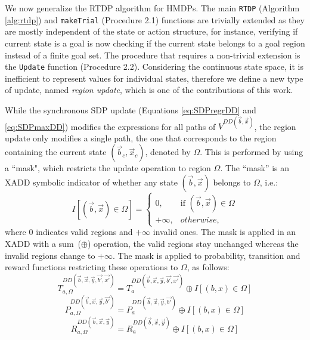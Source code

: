 \documentclass[letterpaper]{article}
\begin{document}
We now generalize the RTDP algorithm for HMDPs.
The main \texttt{RTDP} (Algorithm \ref{alg:rtdp}) and \texttt{makeTrial} (Procedure 2.1) functions are trivially extended as they are mostly independent of the state or action structure, for instance, verifying if current state is a goal is now checking if the current state belongs to a goal region instead of a finite goal set. %
The procedure that requires a non-trivial extension is the \texttt{Update} function (Procedure 2.2).
Considering the continuous state space, it is inefficient to represent values for individual states, therefore we define a new type of update, named \emph{region update}, which is one of the contributions of this work.

While the synchronous SDP update (Equations \ref{eq:SDPregrDD} and \ref{eq:SDPmaxDD}) modifies the expressions for all paths of $V^{DD(\vec{b},\vec{x})}$, the region update only modifies a single path, the one that corresponds to the region containing the current state $(\vec{b}_c,\vec{x}_c)$, denoted by $\Omega$.
This is performed by using a ``mask", which restricts the update operation to region $\Omega$. The  ``mask'' is an XADD symbolic indicator of whether any state $(\vec{b},\vec{x})$ belongs to $\Omega$, i.e.:
\begin{equation}
I[ (\vec{b},\vec{x}) \in \Omega] = \begin{cases}
	0,&\mbox{if } (\vec{b},\vec{x}) \in \Omega\\
	+\infty, & otherwise,
	\end{cases}
\end{equation}
where $0$ indicates valid regions and $+\infty$ invalid ones. The mask is applied in an XADD with a sum~($\oplus$) operation, the valid regions stay unchanged whereas the invalid regions change to $+\infty$.
The mask is applied to probability, transition and reward functions restricting these operations to $\Omega$, as follows:
\begin{equation}
T_{a,\Omega}^{DD(\vec{b},\vec{x},\vec{y},\vec{b'},\vec{x'})} = T_{a}^{DD(\vec{b},\vec{x},\vec{y},\vec{b'},\vec{x'})} \oplus I[ (b,x) \in \Omega] 
\end{equation}
\begin{equation}
P_{a,\Omega}^{DD(\vec{b},\vec{x},\vec{y},\vec{b'})} = P_{a}^{DD(\vec{b},\vec{x},\vec{y},\vec{b'})} \oplus I[ (b,x) \in \Omega] 
\end{equation}
\begin{equation}
R_{a,\Omega}^{DD(\vec{b},\vec{x},\vec{y})} = R_{a}^{DD(\vec{b},\vec{x},\vec{y})} \oplus I[ (b,x) \in \Omega] 
\end{equation}
\end{document}
